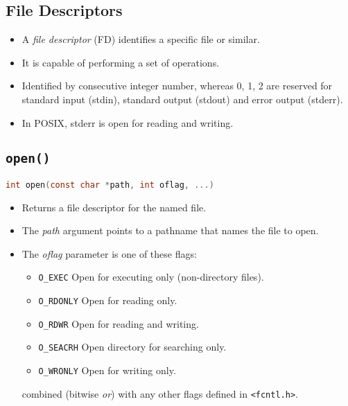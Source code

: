 \documentclass[a4paper, 11pt, accentcolor = tud3b]{tudreport}
\begin{document}
            \subsection{File Descriptors}
                \begin{itemize}
                	\item A \textit{file descriptor} (FD) identifies a specific file or similar.
                	\item It is capable of performing a set of operations.
                	\item Identified by consecutive integer number, whereas 0, 1, 2 are reserved for standard input (stdin), standard output (stdout) and error output (stderr).
                	\item In POSIX, stderr is open for reading and writing.
                \end{itemize}

            \subsection{\texttt{open()}}
	            \lstinline[language = C]|int open(const char *path, int oflag, ...)|
                \begin{itemize}
                	\item Returns a file descriptor for the named file.
                	\item The \textit{path} argument points to a pathname that names the file to open.
                	\item The \textit{oflag} parameter is one of these flags:
	                	\begin{itemize}
	                		\item \texttt{O\_EXEC} \tabto{2cm} Open for executing only (non-directory files).
	                		\item \texttt{O\_RDONLY} \tabto{2cm} Open for reading only.
	                		\item \texttt{O\_RDWR} \tabto{2cm} Open for reading and writing.
	                		\item \texttt{O\_SEACRH} \tabto{2cm} Open directory for searching only.
	                		\item \texttt{O\_WRONLY} \tabto{2cm} Open for writing only.
	                	\end{itemize}
	                	combined (bitwise \textit{or}) with any other flags defined in \texttt{<fcntl.h>}.
                \end{itemize}
\end{document}
